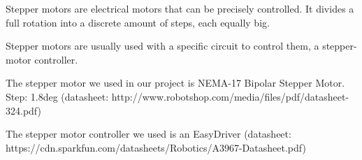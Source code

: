 Stepper motors are electrical motors that can be precisely controlled.
It divides a full rotation into a discrete amount of steps, each equally big.

Stepper motors are usually used with a specific circuit to control them, a stepper-motor controller.

The stepper motor we used in our project is NEMA-17 Bipolar Stepper Motor.
Step: 1.8deg
(datasheet: http://www.robotshop.com/media/files/pdf/datasheet-324.pdf)

The stepper motor controller we used is an EasyDriver
(datasheet: https://cdn.sparkfun.com/datasheets/Robotics/A3967-Datasheet.pdf)
